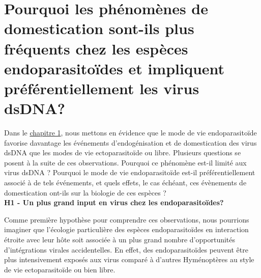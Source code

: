 


\section{Pourquoi les phénomènes de domestication sont-ils plus fréquents chez les espèces endoparasitoïdes et impliquent préférentiellement les virus dsDNA?}

Dans le \hyperref[sec:chap1]{chapitre 1}, nous mettons en évidence que le mode de vie endoparasitoïde favorise davantage les événements d'endogénisation et de domestication des virus dsDNA que les modes de vie ectoparasitoïde ou libre. Plusieurs questions se posent à la suite de ces observations. Pourquoi ce phénomène est-il limité aux virus dsDNA ? Pourquoi le mode de vie endoparasitoïde est-il préférentiellement associé à de tels événements, et quels effets, le cas échéant, ces évènements de domestication ont-ils sur la biologie de ces espèces ?\\

\textbf{H1 - Un plus grand input en virus chez les endoparasitoïdes?}

Comme première hypothèse pour comprendre ces observations, nous pourrions imaginer que l'écologie particulière des espèces endoparasitoïdes  en interaction étroite avec leur hôte soit associée à un plus grand nombre d'opportunités d'intégrations virales accidentelles. En effet, des endoparasitoïdes peuvent être plus intensivement exposés aux virus comparé à d'autres Hyménoptères au style de vie ectoparasitoïde ou bien libre.

